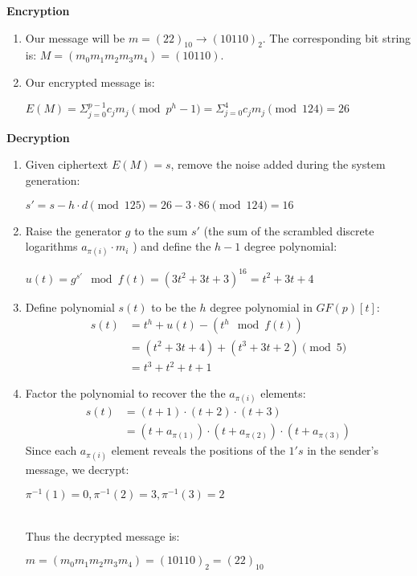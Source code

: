 \documentclass[12pt,a4paper,titlepage]{article}
\begin{document}
\textbf{Encryption}
\begin{enumerate}

	\item Our message will be $m = (22)_{10} \rightarrow (10110)_2$. The corresponding bit string is: $M = (m_0 m_1 m_2 m_3 m_4) = (10110)$. \\ 
	
	\item Our encrypted message is:\\
\centerline{	$ E(M) = \Sigma_{j = 0}^{p-1} c_j m_j \pmod{p^h- 1} = \Sigma_{j = 0}^{4} c_j m_j \pmod{124} = 26$}

	
\end{enumerate}
	
\textbf{Decryption}
\begin{enumerate}

	\item Given ciphertext $E(M) = s$, remove the noise added during the system generation:\\  \centerline{$s' = s - h\cdot d \pmod{125} = 26 - 3 \cdot 86 \pmod{124} = 16$}
	
	\item Raise the generator $g$ to the sum $s'$ (the sum of the scrambled discrete logarithms $a_{\pi(i)} \cdot m_i$ ) and define the $h-1$ degree polynomial: \\ \centerline{ $u(t) = g^{s'} \mod f(t) = (3t^2 + 3t + 3)^{16} = t^2 + 3t + 4$ }
	
	\item Define polynomial $s(t)$ to be the $h$ degree polynomial in $GF(p)[t]$: 
\begin{align*}
	s(t) &= t^h + u(t) - (t^h \mod{ f(t)} ) \\
	&= (t^2 + 3t + 4) + (t^3 + 3t + 2) \pmod{5} \\
	&= t^3 + t^2 + t + 1
	\end{align*}
	
	\item Factor the polynomial to recover the the $a_{\pi(i)}$ elements: 
	\begin{align*}
	s(t) &= (t + 1)\cdot (t + 2) \cdot (t + 3) \\
	     &= (t + a_{\pi(1)}) \cdot(t + a_{\pi(2)}) \cdot(t + a_{\pi(3)}) 
	\end{align*}
	Since each $a_{\pi(i)}$ element reveals the positions of the $1's$ in the sender's message, we decrypt: \\ \centerline{$ \pi^{-1} (1) = 0, \pi^{-1} (2) = 3, \pi^{-1} (3) = 2$} \\ Thus the decrypted message is: \\ \centerline{$ m = (m_0 m_1 m_2 m_3 m_4) = (1 0 1 1 0 )_2 = (22)_{10}$}
	
\end{enumerate}
\end{document}
